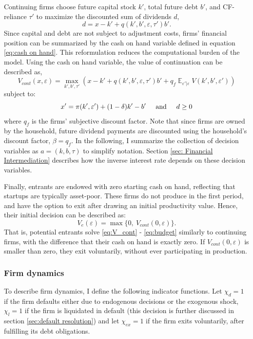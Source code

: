 \documentclass[12pt]{article}
\DeclareMathOperator{\E}{\mathbb{E}}
\begin{document}
Continuing firms choose future capital stock $k'$, total future debt $b'$, and CF-reliance $\tau'$ to maximize the discounted sum of dividends $d$, 
\begin{equation} \label{eq:dividends}
d = x - k' + q(k',b',\varepsilon, \tau')b'.
\end{equation} 
Since capital and debt are not subject to adjustment costs, firms' financial position can be summarized by the cash on hand variable defined in equation \ref{eq:cash on hand}. This reformulation reduces the computational burden of the model. Using the cash on hand variable, the value of continuation can be described as,
\begin{equation} \label{eq:V_cont}
 V_{cont}(x,\varepsilon) = \max_{k',b', \tau'} \left(x - k' +  q(k',b',\varepsilon, \tau')b' + q_f \E_{\varepsilon'|\varepsilon} V(k',b', \varepsilon') \right)
\end{equation}
subject to: 
\begin{equation} \label{eq:budget}
x' = \pi(k',\varepsilon')+(1-\delta)k'-b' \hspace{5mm} \text{and} \hspace{5mm} d \geq 0
\end{equation} 
where $q_f$ is the firms' subjective discount factor. Note that since firms are owned by the household, future dividend payments are discounted using the household's discount factor, $\beta = q_f$. In the following, I summarize the collection of decision variables as $a = (k, b, \tau) $ to simplify notation. Section \ref{sec: Financial Intermediation} describes how the inverse interest rate depends on these decision variables. 

Finally, entrants are endowed with zero starting cash on hand, reflecting that startups are typically asset-poor. These firms do not produce in the first period, and have the option to exit after drawing an initial productivity value. Hence, their initial decision can be described as: 
\begin{equation} \label{eq:entrant decision}
 V_e(\varepsilon) = \max \{0, \ V_{cont}(0,\varepsilon) \}.
\end{equation}
That is, potential entrants solve \ref{eq:V_cont} - \ref{eq:budget} similarly to continuing firms, with the difference that their cash on hand is exactly zero. If $V_{cont}(0,\varepsilon)$ is smaller than zero, they exit voluntarily, without ever participating in production.

\subsubsection{Firm dynamics}
To describe firm dynamics, I define the following indicator functions. Let $\chi_{d} = 1$ if the firm defaults either due to endogenous decisions or the exogenous shock, $\chi_l = 1$ if the firm is liquidated in default (this decision is further discussed in section \ref{sec:default resolution}) and let $\chi_{ex} = 1$ if the firm exits voluntarily, after fulfilling its debt obligations. 
\end{document}
